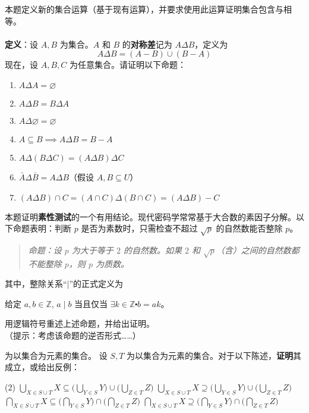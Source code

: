 \begin{exercise}
    本题定义新的集合运算（基于现有运算），并要求使用此运算证明集合包含与相等。\\
    \\
    \textbf{定义}：设 $A,B$ 为集合。$A$ 和 $B$ 的\textbf{对称差}记为 $A \Delta B$，定义为
    \[A \Delta B = (A - B) \cup (B - A)\]
    现在，设 $A,B,C$ 为任意集合。请证明以下命题：

    \begin{enumerate}[label=(\alph*)]
        \item $A \Delta A = \varnothing$
        \item $A \Delta B = B \Delta A$
        \item $A \Delta \varnothing = \varnothing$
        \item $A \subseteq B \implies A \Delta B = B - A$
        \item $A \Delta (B \Delta C) = (A \Delta B) \Delta C$
        \item $\bar{A} \Delta \bar{B} = A \Delta B$（假设 $A, B \subseteq U$）
        \item $ (A \Delta B) \cap C = (A \cap C) \Delta (B \cap C) = (A \Delta B) - C$
    \end{enumerate} 
\end{exercise}

\begin{exercise}
    本题证明\textbf{素性测试}的一个有用结论。现代密码学常常基于大合数的素因子分解。以下命题表明：判断 $p$ 是否为素数时，只需检查不超过 $\sqrt{p}$ 的自然数能否整除 $p$。

    \begin{quote}
        \emph{命题：设 $p$ 为大于等于 $2$ 的自然数。如果 $2$ 和 $\sqrt{p}$（含）之间的自然数都不能整除 $p$，则 $p$ 为质数。}
    \end{quote}
    其中，整除关系``$\mid$''的正式定义为
    \begin{center}
        给定 $a, b \in \mathbb{Z}$, $a \mid b$ 当且仅当 $\exists k \in \mathbb{Z} \centerdot b = ak$。
    \end{center}
    用逻辑符号重述上述命题，并给出证明。\\
    （提示：考虑该命题的逆否形式……）
\end{exercise}

\begin{exercise}
    为以集合为元素的集合。
    设 $S, T$ 为以集合为元素的集合。对于以下陈述，\textbf{证明}其成立，或给出反例：

    \begin{tasks}[label=(\alph*)](2)
        \task $\displaystyle \bigcup_{X \in S \cup T} X \subseteq \Bigg(\bigcup_{Y \in S} Y\Bigg) \cup \Bigg(\bigcup_{Z \in T} Z\Bigg)$
        \task $\displaystyle \bigcup_{X \in S \cup T} X \supseteq \Bigg(\bigcup_{Y \in S} Y\Bigg) \cup \Bigg(\bigcup_{Z \in T} Z\Bigg)$
        \task $\displaystyle \bigcap_{X \in S \cup T} X \subseteq \Bigg(\bigcap_{Y \in S} Y\Bigg) \cap \Bigg(\bigcap_{Z \in T} Z\Bigg)$
        \task $\displaystyle \bigcap_{X \in S \cup T} X \supseteq \Bigg(\bigcap_{Y \in S} Y\Bigg) \cap \Bigg(\bigcap_{Z \in T} Z\Bigg)$
    \end{tasks} 
\end{exercise}